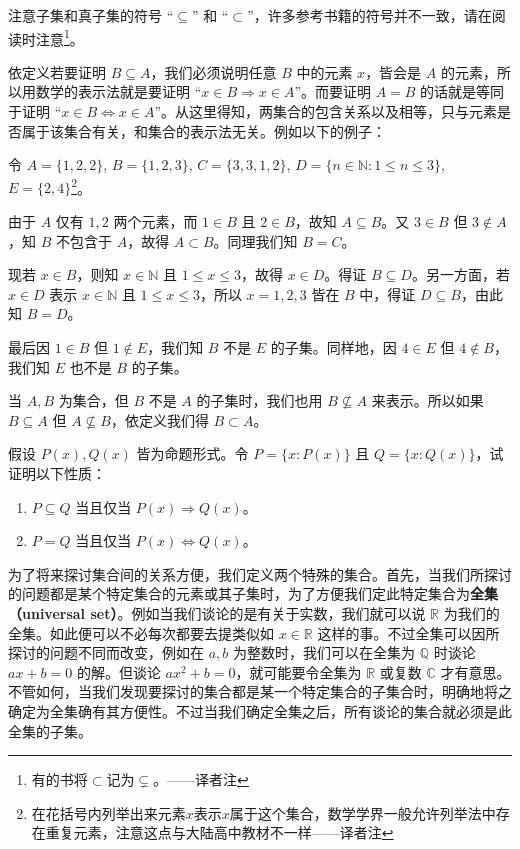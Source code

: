 注意子集和真子集的符号 “$\subseteq$” 和 “$\subset$”，许多参考书籍的符号并不一致，请在阅读时注意\footnote{有的书将$\subset$记为$\subsetneq$。——译者注}。

依定义若要证明 $B \subseteq A$，我们必须说明任意 $B$ 中的元素 $x$，皆会是 $A$ 的元素，所以用数学的表示法就是要证明 “$x \in B \Rightarrow x \in A$”。而要证明 $A = B$ 的话就是等同于证明 “$x \in B \Leftrightarrow x \in A$”。从这里得知，两集合的包含关系以及相等，只与元素是否属于该集合有关，和集合的表示法无关。例如以下的例子：

\begin{example}
令 $A = \{1, 2, 2\}$, $B = \{1, 2, 3\}$, $C = \{3, 3, 1, 2\}$, $D = \{n \in \mathbb{N} : 1 \leq n \leq 3\}$, $E = \{2, 4\}$\footnote{在花括号内列举出来元素$x$表示$x$属于这个集合，数学学界一般允许列举法中存在重复元素，注意这点与大陆高中教材不一样——译者注}。

由于 $A$ 仅有 $1, 2$ 两个元素，而 $1 \in B$ 且 $2 \in B$，故知 $A \subseteq B$。又 $3 \in B$ 但 $3 \notin A$，知 $B$ 不包含于 $A$，故得 $A \subset B$。同理我们知 $B = C$。

现若 $x \in B$，则知 $x \in \mathbb{N}$ 且 $1 \leq x \leq 3$，故得 $x \in D$。得证 $B \subseteq D$。另一方面，若 $x \in D$ 表示 $x \in \mathbb{N}$ 且 $1 \leq x \leq 3$，所以 $x = 1, 2, 3$ 皆在 $B$ 中，得证 $D \subseteq B$，由此知 $B = D$。

最后因 $1 \in B$ 但 $1 \notin E$，我们知 $B$ 不是 $E$ 的子集。同样地，因 $4 \in E$ 但 $4 \notin B$，我们知 $E$ 也不是 $B$ 的子集。
\end{example}

当 $A, B$ 为集合，但 $B$ 不是 $A$ 的子集时，我们也用 $B \nsubseteq A$ 来表示。所以如果 $B \subseteq A$ 但 $A \nsubseteq B$，依定义我们得 $B \subset A$。

\begin{question}
假设 $P(x), Q(x)$ 皆为命题形式。令 $P = \{x : P(x)\}$ 且 $Q = \{x : Q(x)\}$，试证明以下性质：
\begin{enumerate}[label={(\arabic*)}]
  \item $P \subseteq Q$ 当且仅当 $P(x) \Rightarrow Q(x)$。
  \item $P = Q$ 当且仅当 $P(x) \Leftrightarrow Q(x)$。
\end{enumerate}
\end{question}

为了将来探讨集合间的关系方便，我们定义两个特殊的集合。首先，当我们所探讨的问题都是某个特定集合的元素或其子集时，为了方便我们定此特定集合为\textbf{全集（universal set）}。例如当我们谈论的是有关于实数，我们就可以说 $\mathbb{R}$ 为我们的全集。如此便可以不必每次都要去提类似如 $x \in \mathbb{R}$ 这样的事。不过全集可以因所探讨的问题不同而改变，例如在 $a, b$ 为整数时，我们可以在全集为 $\mathbb{Q}$ 时谈论 $ax + b = 0$ 的解。但谈论 $ax^2 + b = 0$，就可能要令全集为 $\mathbb{R}$ 或复数 $\mathbb{C}$ 才有意思。不管如何，当我们发现要探讨的集合都是某一个特定集合的子集合时，明确地将之确定为全集确有其方便性。不过当我们确定全集之后，所有谈论的集合就必须是此全集的子集。

